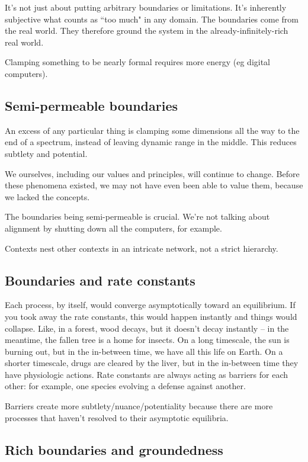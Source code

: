 It's not just about putting arbitrary boundaries or limitations. It's inherently subjective what counts as ``too much" in any domain. The boundaries come from the real world. They therefore ground the system in the already-infinitely-rich real world. 


Clamping something to be nearly formal requires more energy (eg digital computers).




\subsection{Semi-permeable boundaries}

An excess of any particular thing is clamping some dimensions all the way to the end of a spectrum, instead of leaving dynamic range in the middle. This reduces subtlety and potential. 

We ourselves, including our values and principles, will continue to change.  Before these phenomena existed, we may not have even been able to value them, because we lacked the concepts. 

The boundaries being semi-permeable is crucial. We're not talking about alignment by shutting down all the computers, for example.

Contexts nest other contexts in an intricate network, not a strict hierarchy.


\subsection{Boundaries and rate constants}

Each process, by itself, would converge asymptotically toward an equilibrium. If you took away the rate constants, this would happen instantly and things would collapse. Like, in a forest, wood decays, but it doesn't decay instantly -- in the meantime, the fallen tree is a home for insects. On a long timescale, the sun is burning out, but in the in-between time, we have all this life on Earth. On a shorter timescale, drugs are cleared by the liver, but in the in-between time they have physiologic actions. Rate constants are always acting as barriers for each other: for example, one species evolving a defense against another.

Barriers create more subtlety/nuance/potentiality because there are more processes that haven't resolved to their asymptotic equilibria. 

\subsection{Rich boundaries and groundedness}

